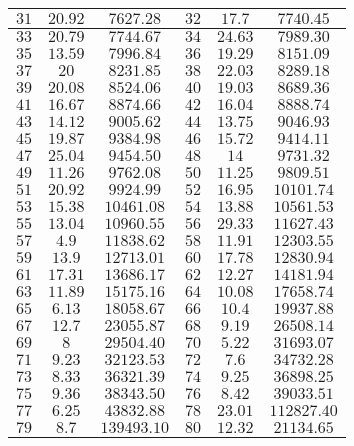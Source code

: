 \begin{center}
\begin{longtable}{|c|c|c||c|c|c|}
        $31$ & $20.92$ & $7627.28$ & $32$ & $17.7$ & $7740.45$ \\ \hline
        $33$ & $20.79$ & $7744.67$ & $34$ & $24.63$ & $7989.30$ \\ \hline
        $35$ & $13.59$ & $7996.84$ & $36$ & $19.29$ & $8151.09$ \\ \hline
        $37$ & $20$ & $8231.85$ & $38$ & $22.03$ & $8289.18$ \\ \hline
        $39$ & $20.08$ & $8524.06$ & $40$ & $19.03$ & $8689.36$ \\ \hline
        $41$ & $16.67$ & $8874.66$ & $42$ & $16.04$ & $8888.74$ \\ \hline
        $43$ & $14.12$ & $9005.62$ & $44$ & $13.75$ & $9046.93$ \\ \hline
        $45$ & $19.87$ & $9384.98$ & $46$ & $15.72$ & $9414.11$ \\ \hline
        $47$ & $25.04$ & $9454.50$ & $48$ & $14$ & $9731.32$ \\ \hline
        $49$ & $11.26$ & $9762.08$ & $50$ & $11.25$ & $9809.51$ \\ \hline
        $51$ & $20.92$ & $9924.99$ & $52$ & $16.95$ & $10101.74$ \\ \hline
        $53$ & $15.38$ & $10461.08$ & $54$ & $13.88$ & $10561.53$ \\ \hline
        $55$ & $13.04$ & $10960.55$ & $56$ & $29.33$ & $11627.43$ \\ \hline
        $57$ & $4.9$ & $11838.62$ & $58$ & $11.91$ & $12303.55$ \\ \hline
        $59$ & $13.9$ & $12713.01$ & $60$ & $17.78$ & $12830.94$ \\ \hline
        $61$ & $17.31$ & $13686.17$ & $62$ & $12.27$ & $14181.94$ \\ \hline
        $63$ & $11.89$ & $15175.16$ & $64$ & $10.08$ & $17658.74$ \\ \hline
        $65$ & $6.13$ & $18058.67$ & $66$ & $10.4$ & $19937.88$ \\ \hline
        $67$ & $12.7$ & $23055.87$ & $68$ & $9.19$ & $26508.14$ \\ \hline
        $69$ & $8$ & $29504.40$ & $70$ & $5.22$ & $31693.07$ \\ \hline
        $71$ & $9.23$ & $32123.53$ & $72$ & $7.6$ & $34732.28$ \\ \hline
        $73$ & $8.33$ & $36321.39$ & $74$ & $9.25$ & $36898.25$ \\ \hline
        $75$ & $9.36$ & $38343.50$ & $76$ & $8.42$ & $39033.51$ \\ \hline
        $77$ & $6.25$ & $43832.88$ & $78$ & $23.01$ & $112827.40$ \\ \hline
        $79$ & $8.7$ & $139493.10$ & $80$ & $12.32$ & $21134.65$ \\ \hline
    \end{longtable}
\end{center}
